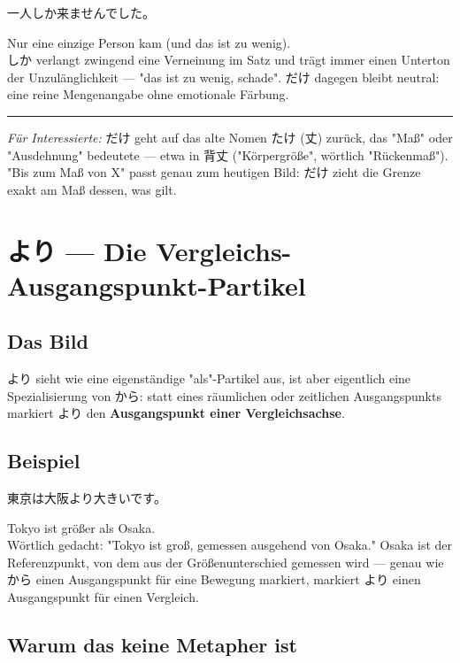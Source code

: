 \documentclass[12pt]{book}
\begin{document}
\par\quad 一人しか来ませんでした。\\
\par\quad Nur eine einzige Person kam (und das ist zu wenig).\\

しか verlangt zwingend eine Verneinung im Satz und trägt immer einen Unterton der Unzulänglichkeit — "das ist zu wenig, schade". だけ dagegen bleibt neutral: eine reine Mengenangabe ohne emotionale Färbung.

\bigskip\hrule\bigskip

\emph{Für Interessierte:} だけ geht auf das alte Nomen たけ (丈) zurück, das "Maß" oder "Ausdehnung" bedeutete — etwa in 背丈 ("Körpergröße", wörtlich "Rückenmaß"). "Bis zum Maß von X" passt genau zum heutigen Bild: だけ zieht die Grenze exakt am Maß dessen, was gilt.


\chapter{より — Die Vergleichs-Ausgangspunkt-Partikel}

\section*{Das Bild}

より sieht wie eine eigenständige "als"-Partikel aus, ist aber eigentlich eine Spezialisierung von から: statt eines räumlichen oder zeitlichen Ausgangspunkts markiert より den \textbf{Ausgangspunkt einer Vergleichsachse}.

\section*{Beispiel}

\par\quad 東京は大阪より大きいです。\\
\par\quad Tokyo ist größer als Osaka.\\

Wörtlich gedacht: "Tokyo ist groß, gemessen ausgehend von Osaka." Osaka ist der Referenzpunkt, von dem aus der Größenunterschied gemessen wird — genau wie から einen Ausgangspunkt für eine Bewegung markiert, markiert より einen Ausgangspunkt für einen Vergleich.

\section*{Warum das keine Metapher ist}
\end{document}
